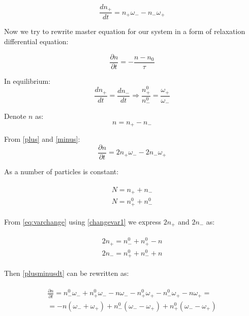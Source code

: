 \documentclass[10pt]{article}
\begin{document}
\begin{equation}\label{plus}
\frac{d n_{+}}{dt} = n_{+} \omega_{-} - n_{-} \omega_{+}
\end{equation}

Now we try to rewrite master equation for our system in a form of relaxation differential equation:

\begin{equation}\label{qw}
\frac{\partial n}{\partial t} = - \frac{ n - n_0}{\tau}
\end{equation}

In equilibrium:
\begin{equation}\label{plusminus}
\frac{d n_{+}}{dt} = \frac{d n_{-}}{dt} \Rightarrow \frac{n_{+}^0}{n_{-}^0} = \frac{\omega_{+}}{\omega_{-}} 
\end{equation}

Denote $n$ as:
\begin{equation}\label{changevar1}
n= n_{+} - n_{-}
\end{equation}

From \ref{plus} and \ref{minus}:
\begin{equation}\label{plusminusdt}
\frac{\partial n}{\partial t} = 2n_{+}\omega_{-} - 2n_{-}\omega_{+}
\end{equation}

As a number of particles is constant:

\begin{align}
\begin{split}
N = n_{+} + n_{-} \\
N = n_{+}^0 + n_{-}^0
\label{eq:varchange}
\end{split}
\end{align}

From \ref{eq:varchange} using \ref{changevar1} we express $2n_{+}$ and $2n_{-}$ as:

\begin{align}
\begin{split}
2n_{+} = n_{-}^0 + n_{+}^0 - n\\
2n_{-} = n_{+}^0 + n_{-}^0 + n
\label{eq:2n}
\end{split}
\end{align}

Then \ref{plusminusdt} can be rewritten as:

\begin{align}
\begin{split}
\frac{\partial n}{\partial t} = n_{-}^0\omega_{-} + n_{+}^0\omega_{-} - n\omega_{-} - n_{+}^0\omega_{+} - n_{-}^0\omega_{+} - n\omega_{+} = \\
= -n(\omega_{-} + \omega_{+}) + n_{-}^0(\omega_{-} - \omega_{+}) + n_{+}^0(\omega_{-} - \omega_{+})
\label{eq:newvar}
\end{split}
\end{align}
\end{document}
